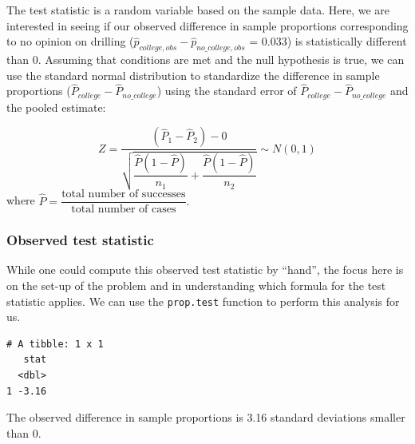 \documentclass[12pt, krantz2,]{krantz}
\makeatletter
\newenvironment{Shaded}{\begin{snugshade}}{\end{snugshade}}
\newcommand{\DataTypeTok}[1]{\textcolor[rgb]{0.27,0.27,0.27}{#1}}
\newcommand{\KeywordTok}[1]{\textcolor[rgb]{0.27,0.27,0.27}{\textbf{#1}}}
\newcommand{\NormalTok}[1]{#1}
\newcommand{\OperatorTok}[1]{\textcolor[rgb]{0.43,0.43,0.43}{\textbf{#1}}}
\newcommand{\StringTok}[1]{\textcolor[rgb]{0.5,0.5,0.5}{#1}}
\newenvironment{kframe}{%
\medskip{}
\setlength{\fboxsep}{.8em}
 \def\at@end@of@kframe{}%
 \ifinner\ifhmode%
  \def\at@end@of@kframe{\end{minipage}}%
  \begin{minipage}{\columnwidth}%
 \fi\fi%
 \def\FrameCommand##1{\hskip\@totalleftmargin \hskip-\fboxsep
 \colorbox{shadecolor}{##1}\hskip-\fboxsep
     \hskip-\linewidth \hskip-\@totalleftmargin \hskip\columnwidth}%
 \MakeFramed {\advance\hsize-\width
   \@totalleftmargin\z@ \linewidth\hsize
   \@setminipage}}%
 {\par\unskip\endMakeFramed%
 \at@end@of@kframe}
\renewenvironment{Shaded}{\begin{kframe}}{\end{kframe}}
\makeatother
\begin{document}
The test statistic is a random variable based on the sample data. Here, we are interested in seeing if our observed difference in sample proportions corresponding to no opinion on drilling (\(\hat{p}_{college, obs} - \hat{p}_{no\_college, obs}\) = 0.033) is statistically different than 0. Assuming that conditions are met and the null hypothesis is true, we can use the standard normal distribution to standardize the difference in sample proportions (\(\hat{P}_{college} - \hat{P}_{no\_college}\)) using the standard error of \(\hat{P}_{college} - \hat{P}_{no\_college}\) and the pooled estimate:

\[ Z =\dfrac{ (\hat{P}_1 - \hat{P}_2) - 0}{\sqrt{\dfrac{\hat{P}(1 - \hat{P})}{n_1} + \dfrac{\hat{P}(1 - \hat{P})}{n_2} }} \sim N(0, 1) \] where \(\hat{P} = \dfrac{\text{total number of successes} }{ \text{total number of cases}}.\)

\hypertarget{observed-test-statistic-2}{%
\subsubsection*{Observed test statistic}\label{observed-test-statistic-2}}


While one could compute this observed test statistic by ``hand'', the focus here is on the set-up of the problem and in understanding which formula for the test statistic applies. We can use the \texttt{prop.test} function to perform this analysis for us.

\begin{Shaded}
\end{Shaded}

\begin{verbatim}
# A tibble: 1 x 1
   stat
  <dbl>
1 -3.16
\end{verbatim}

The observed difference in sample proportions is 3.16 standard deviations smaller than 0.
\end{document}
